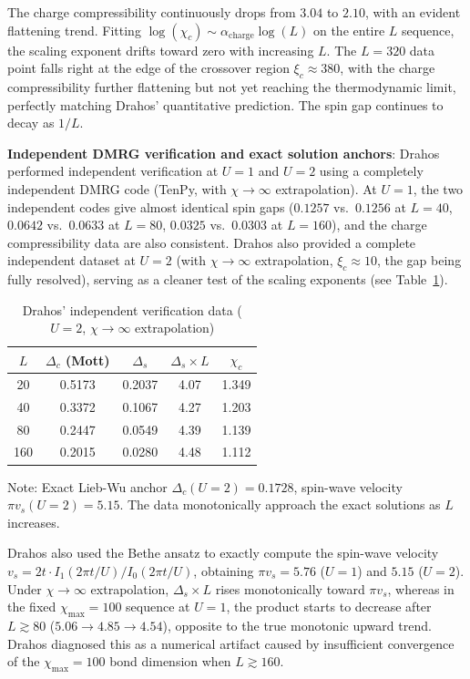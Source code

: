 \documentclass[prb,reprint,twocolumn,superscriptaddress]{revtex4-2}
\begin{document}
The charge compressibility continuously drops from $3.04$ to $2.10$, with an evident flattening trend. Fitting $\log(\chi_c) \sim \alpha_{\mathrm{charge}} \log(L)$ on the entire $L$ sequence, the scaling exponent drifts toward zero with increasing $L$. The $L=320$ data point falls right at the edge of the crossover region $\xi_c \approx 380$, with the charge compressibility further flattening but not yet reaching the thermodynamic limit, perfectly matching Drahos' quantitative prediction. The spin gap continues to decay as $1/L$.

\textbf{Independent DMRG verification and exact solution anchors}: Drahos performed independent verification at $U=1$ and $U=2$ using a completely independent DMRG code (TenPy, with $\chi \to \infty$ extrapolation). At $U=1$, the two independent codes give almost identical spin gaps ($0.1257$ vs.\ $0.1256$ at $L=40$, $0.0642$ vs.\ $0.0633$ at $L=80$, $0.0325$ vs.\ $0.0303$ at $L=160$), and the charge compressibility data are also consistent. Drahos also provided a complete independent dataset at $U=2$ (with $\chi \to \infty$ extrapolation, $\xi_c \approx 10$, the gap being fully resolved), serving as a cleaner test of the scaling exponents (see Table~\ref{tab:Drahos_U2}).

\begin{table}[htbp]
\caption{Drahos' independent verification data ($U=2$, $\chi \to \infty$ extrapolation)}
\label{tab:Drahos_U2}
\begin{tabular}{ccccc}
\toprule
$L$ & $\Delta_c$ (Mott) & $\Delta_s$ & $\Delta_s \times L$ & $\chi_c$ \\
\midrule
20 & 0.5173 & 0.2037 & 4.07 & 1.349 \\
40 & 0.3372 & 0.1067 & 4.27 & 1.203 \\
80 & 0.2447 & 0.0549 & 4.39 & 1.139 \\
160 & 0.2015 & 0.0280 & 4.48 & 1.112 \\
\bottomrule
\end{tabular}
\par
\smallskip
\small Note: Exact Lieb-Wu anchor $\Delta_c(U=2) = 0.1728$, spin-wave velocity $\pi v_s(U=2) = 5.15$. The data monotonically approach the exact solutions as $L$ increases.
\end{table}

Drahos also used the Bethe ansatz to exactly compute the spin-wave velocity $v_s = 2t \cdot I_1(2\pi t/U) / I_0(2\pi t/U)$, obtaining $\pi v_s = 5.76$ ($U=1$) and $5.15$ ($U=2$). Under $\chi \to \infty$ extrapolation, $\Delta_s \times L$ rises monotonically toward $\pi v_s$, whereas in the fixed $\chi_{\max} = 100$ sequence at $U=1$, the product starts to decrease after $L \gtrsim 80$ ($5.06 \to 4.85 \to 4.54$), opposite to the true monotonic upward trend. Drahos diagnosed this as a numerical artifact caused by insufficient convergence of the $\chi_{\max} = 100$ bond dimension when $L \gtrsim 160$.
\end{document}
